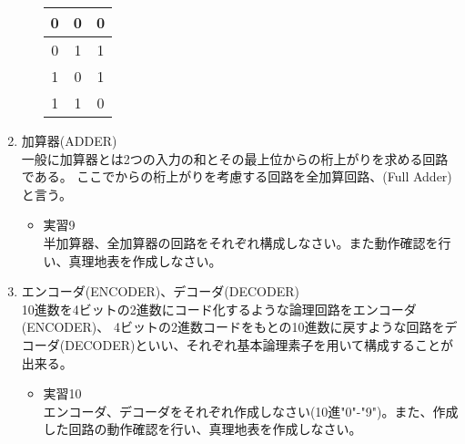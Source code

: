 \documentclass[dvipdfmx]{jsarticle}
\begin{document}
\begin{enumerate}
\begin{itemize}
\begin{table}[H]
\begin{tabular}{|c|c|c|}
											0 & 0 & 0\\ \hline
											0 & 1 & 1\\ \hline
											1 & 0 & 1\\ \hline
											1 & 1 & 0\\ \hline
										\end{tabular}
									\end{table}
							\end{itemize}
						\item 加算器(ADDER) \\
							一般に加算器とは2つの入力の和とその最上位からの桁上がりを求める回路である。
							ここでからの桁上がりを考慮する回路を全加算回路、(Full Adder)と言う。
							\begin{itemize}
								\item 実習9\\
								半加算器、全加算器の回路をそれぞれ構成しなさい。また動作確認を行い、真理地表を作成しなさい。

							\end{itemize}
						\item エンコーダ(ENCODER)、デコーダ(DECODER) \\
							10進数を4ビットの2進数にコード化するような論理回路をエンコーダ(ENCODER)、
							4ビットの2進数コードをもとの10進数に戻すような回路をデコーダ(DECODER)といい、それぞれ基本論理素子を用いて構成することが出来る。
							\begin{itemize}
								\item 実習10 \\
									エンコーダ、デコーダをそれぞれ作成しなさい(10進"0"-"9")。また、作成した回路の動作確認を行い、真理地表を作成しなさい。
							\end{itemize}
					\end{enumerate}
\end{document}
